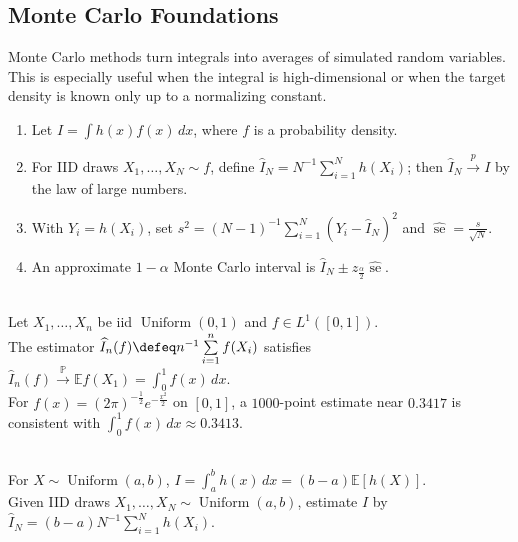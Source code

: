 \subsection{Monte Carlo Foundations}

Monte Carlo methods turn integrals into averages of simulated random variables. This is especially useful when the integral is high-dimensional or when the target density is known only up to a normalizing constant.

\begin{method} \label{method:basic-monte-carlo-integration} 
\begin{enumerate}[label=(\roman*)]
\setlength{\itemsep}{0pt}
\item Let $I=\int h(x)f(x)\,dx$, where $f$ is a probability density.
\item For IID draws $X_1,\ldots,X_N\sim f$, define $\widehat{I}_N=N^{-1}\sum\limits_{i=1}^{N}h(X_i)$; then $\widehat{I}_N\xrightarrow{p}I$ by the law of large numbers.
\item With $Y_i=h(X_i)$, set $s^2=(N-1)^{-1}\sum\limits_{i=1}^{N}(Y_i-\widehat{I}_N)^2$ and $\widehat{\operatorname{se}}=\frac{s}{\sqrt{N}}$.
\item An approximate $1-\alpha$ Monte Carlo interval is $\widehat{I}_N\pm z_{\frac{\alpha}{2}}\widehat{\operatorname{se}}$.
\end{enumerate}
\end{method}

\begin{example} \label{ex:monte-carlo-integration-lln} \\
Let $X_1,\ldots,X_n$ be iid $\operatorname{Uniform}(0,1)$ and $f\in L^1([0,1])$.\\
The estimator $\widehat I_n(f)\defeq n^{-1}\sum\limits_{i=1}^{n}f(X_i)$ satisfies $\widehat I_n(f)\xrightarrow{\mathbb{P}}\mathbb{E}f(X_1)=\int_0^1f(x)\,dx$.\\
For $f(x)=(2\pi)^{-\frac{1}{2}}e^{-\frac{x^2}{2}}$ on $[0,1]$, a $1000$-point estimate near $0.3417$ is consistent with $\int_0^1f(x)\,dx\approx0.3413$.
\end{example}

\begin{example} \label{ex:uniform-monte-carlo-integral} \\
For $X\sim\operatorname{Uniform}(a,b)$, $I=\int_a^b h(x)\,dx=(b-a)\mathbb{E}[h(X)]$.\\
Given IID draws $X_1,\ldots,X_N\sim\operatorname{Uniform}(a,b)$, estimate $I$ by $\widehat{I}_N=(b-a)N^{-1}\sum\limits_{i=1}^{N}h(X_i)$.
\end{example}

